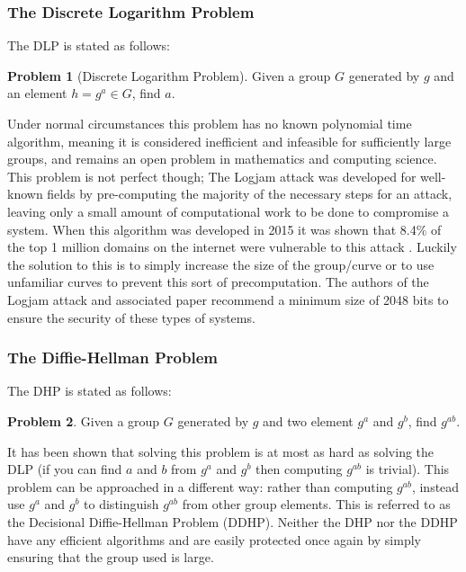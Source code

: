 \documentclass{article}
\theoremstyle{plain}
\theoremstyle{definition}
\newtheorem{problem}{Problem}
\begin{document}
                \subsubsection{The Discrete Logarithm Problem}\label{DLP}
                        The DLP is stated as follows:
                        \begin{problem}[Discrete Logarithm Problem]
                                Given a group $G$ generated by $g$ and an element $h = g^a \in G$, find $a$.
                        \end{problem}
                        Under normal circumstances this problem has no known polynomial time algorithm, meaning it is considered inefficient and infeasible for sufficiently large groups, and remains an open problem in mathematics and computing science.
                        This problem is not perfect though; The Logjam attack was developed for well-known fields by pre-computing the majority of the necessary steps for an attack, leaving only a small amount of computational work to be done to compromise a system.
                        When this algorithm was developed in 2015 it was shown that 8.4\% of the top 1 million domains on the internet were vulnerable to this attack \cite{weakdh15}.
                        Luckily the solution to this is to simply increase the size of the group/curve or to use unfamiliar curves to prevent this sort of precomputation.
                        The authors of the Logjam attack and associated paper recommend a minimum size of 2048 bits to ensure the security of these types of systems.

                \subsubsection{The Diffie-Hellman Problem}\label{DHP}
                        The DHP is stated as follows:
                        \begin{problem}
                                Given a group $G$ generated by $g$ and two element $g^a$ and $g^b$, find $g^{ab}$.
                        \end{problem}
                        It has been shown that solving this problem is at most as hard as solving the DLP (if you can find $a$ and $b$ from $g^a$ and $g^b$ then computing $g^{ab}$ is trivial).
                        This problem can be approached in a different way: rather than computing $g^{ab}$, instead use $g^a$ and $g^b$ to distinguish $g^{ab}$ from other group elements. This is referred to as the Decisional Diffie-Hellman Problem (DDHP).
                        Neither the DHP nor the DDHP have any efficient algorithms and are easily protected once again by simply ensuring that the group used is large.
\end{document}
